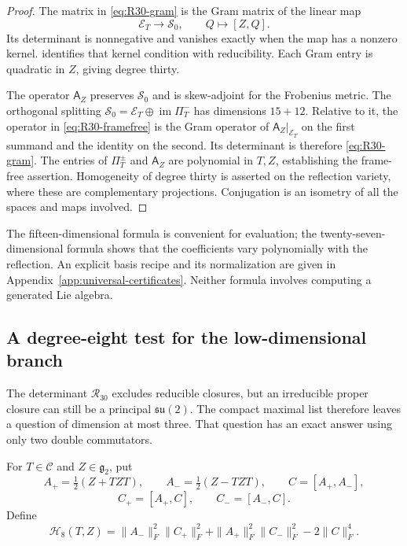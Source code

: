 \documentclass[11pt,a4paper]{article}
\begin{document}
\begin{proof}
The matrix in \eqref{eq:R30-gram} is the Gram matrix of the linear map
\[
\mathscr E_T\longrightarrow\mathscr S_0,\qquad Q\longmapsto[Z,Q].
\]
Its determinant is nonnegative and vanishes exactly when the map has a nonzero kernel.   identifies that kernel condition with reducibility.  Each Gram entry is quadratic in $Z$, giving degree thirty.

The operator $\mathsf A_Z$ preserves $\mathscr S_0$ and is skew-adjoint for the Frobenius metric.  The orthogonal splitting $\mathscr S_0=\mathscr E_T\oplus\operatorname{im}\Pi_T^-$ has dimensions $15+12$.  Relative to it, the operator in \eqref{eq:R30-framefree} is the Gram operator of $\mathsf A_Z|_{\mathscr E_T}$ on the first summand and the identity on the second.  Its determinant is therefore \eqref{eq:R30-gram}.  The entries of $\Pi_T^\pm$ and $\mathsf A_Z$ are polynomial in $T,Z$, establishing the frame-free assertion.  Homogeneity of degree thirty is asserted on the reflection variety, where these are complementary projections.  Conjugation is an isometry of all the spaces and maps involved.
\end{proof}

The fifteen-dimensional formula is convenient for evaluation; the twenty-seven-dimensional formula shows that the coefficients vary polynomially with the reflection.  An explicit basis recipe and its normalization are given in Appendix~\ref{app:universal-certificates}.  Neither formula involves computing a generated Lie algebra.

\subsection{A degree-eight test for the low-dimensional branch}

The determinant $\mathcal R_{30}$ excludes reducible closures, but an irreducible
proper closure can still be a principal $\mathfrak{su}(2)$.  The compact maximal
list therefore leaves a question of dimension at most three.  That question
has an exact answer using only two double commutators.

For $T\in\mathscr C$ and $Z\in\mathfrak g_2$, put
\[
A_+=\tfrac12(Z+TZT),\qquad A_-=\tfrac12(Z-TZT),\qquad C=[A_+,A_-],
\]
\[
C_+=[A_+,C],\qquad C_-=[A_-,C].
\]
Define
\begin{equation}
\mathcal H_8(T,Z)
=\|A_-\|_F^2\|C_+\|_F^2
 +\|A_+\|_F^2\|C_-\|_F^2-2\|C\|_F^4.
\label{eq:H8}
\end{equation}
\end{document}
